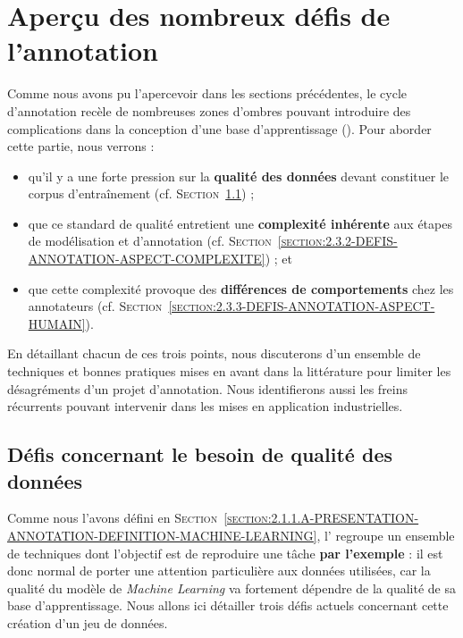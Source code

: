 \section{Aperçu des nombreux défis de l'annotation}
\label{section:2.3-DEFIS-ANNOTATION}

	
	Comme nous avons pu l'apercevoir dans les sections précédentes, le cycle d'annotation recèle de nombreuses zones d'ombres pouvant introduire des complications dans la conception d'une base d'apprentissage (\cite{baledent:2022:complexite-annotation-manuelle}).
	Pour aborder cette partie, nous verrons :
	\begin{itemize}
		\item qu'il y a une forte pression sur la \textbf{qualité des données} devant constituer le corpus d'entraînement (cf. \textsc{Section~\ref{section:2.3.1-DEFIS-ANNOTATION-ASPECT-DONNEES}}) ;
		\item que ce standard de qualité entretient une \textbf{complexité inhérente} aux étapes de modélisation et d'annotation (cf. \textsc{Section~\ref{section:2.3.2-DEFIS-ANNOTATION-ASPECT-COMPLEXITE}}) ; et
		\item que cette complexité provoque des \textbf{différences de comportements} chez les annotateurs (cf. \textsc{Section~\ref{section:2.3.3-DEFIS-ANNOTATION-ASPECT-HUMAIN}}).
	\end{itemize}
	En détaillant chacun de ces trois points, nous discuterons d'un ensemble de techniques et bonnes pratiques mises en avant dans la littérature pour limiter les désagréments d'un projet d'annotation.
	Nous identifierons aussi les freins récurrents pouvant intervenir dans les mises en application industrielles.
	
	
	\subsection{Défis concernant le besoin de qualité des données}
	\label{section:2.3.1-DEFIS-ANNOTATION-ASPECT-DONNEES}
	
		Comme nous l'avons défini en \textsc{Section~\ref{section:2.1.1.A-PRESENTATION-ANNOTATION-DEFINITION-MACHINE-LEARNING}}, l' regroupe un ensemble de techniques dont l'objectif est de reproduire une tâche \textbf{par l'exemple} : il est donc normal de porter une attention particulière aux données utilisées, car la qualité du modèle de \textit{Machine Learning} va fortement dépendre de la qualité de sa base d'apprentissage.
		Nous allons ici détailler trois défis actuels concernant cette création d'un jeu de données.
		
